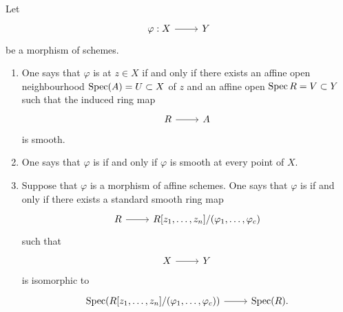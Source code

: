 \documentclass [11 pt, oneside] {article}
\begin{document}
\begin{definition}\label{}\text{}
Let 
\[
\begin{tikzcd}
\varphi:X\ar[r]&Y
\end{tikzcd}
\] 
be a morphism of schemes.
\begin{enumerate}
	\item One says that $\varphi$ is  at $z\in X$ if and only if there exists an affine open neighbourhood $\operatorname{Spec} (A) = U\subset X$ of $z$ and an affine open $\operatorname{Spec} R = V\subset Y$ such that the induced ring map 
	\[
\begin{tikzcd}
R\ar[r]&A
\end{tikzcd}
\] 
 is smooth.
	\item One says that $\varphi$ is  if and only if $\varphi$ is smooth at every point of $X$.
	\item Suppose that $\varphi$ is a morphism of affine schemes. One says that $\varphi$ is  if and only if there exists a standard smooth ring map 
	\[
\begin{tikzcd}
R\ar[r]& R[z_1,\hdots,z_n]/(\varphi_1,\hdots,\varphi_c)
\end{tikzcd}
\] 
 such that 
 \[
\begin{tikzcd}
X\ar[r]&Y
\end{tikzcd}
\]  
is isomorphic to 
		\[
\begin{tikzcd}
\Spec (R[z_1,\hdots,z_n]/(\varphi_1,\hdots,\varphi_c)) \ar[r]& \Spec (R).
\end{tikzcd}
\]
\end{enumerate}
\end{definition}
\end{document}

